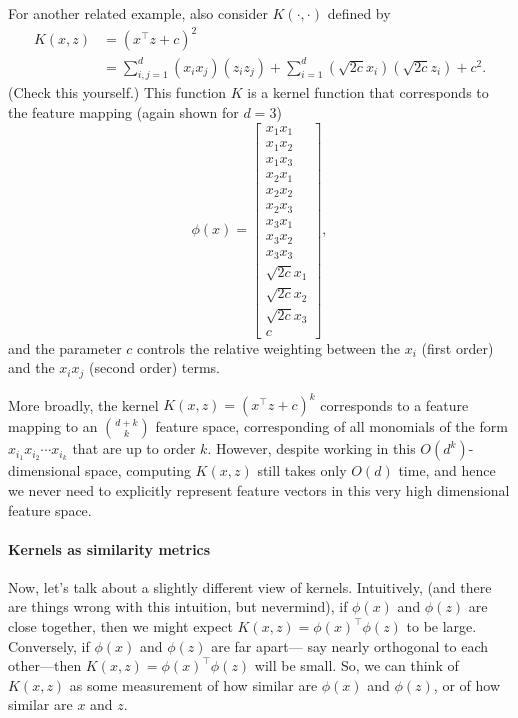 For another related example, also consider $K(\cdot,\cdot)$ defined by
\begin{align*}
    K(x,z) &= (x^\top z + c)^2\\
    &= \sum_{i,j=1}^d (x_i x_j)(z_i z_j) + \sum_{i=1}^d \left(\sqrt{2c}x_i\right) \left(\sqrt{2c}z_i\right) + c^2.
\end{align*}
(Check this yourself.) This function $K$ is a kernel function that corresponds
to the feature mapping (again shown for $d = 3$)
\begin{equation*}
    \phi(x) = \begin{bmatrix}
        x_1 x_1\\
        x_1 x_2\\
        x_1 x_3\\
        x_2 x_1\\
        x_2 x_2\\
        x_2 x_3\\
        x_3 x_1\\
        x_3 x_2\\
        x_3 x_3\\
        \sqrt{2c}x_1\\
        \sqrt{2c}x_2\\
        \sqrt{2c}x_3\\
        c
    \end{bmatrix},    
\end{equation*}
and the parameter $c$ controls the relative weighting between the $x_i$ (first
order) and the $x_i x_j$ (second order) terms.

More broadly, the kernel $K(x,z) = (x^\top z + c)^k$ corresponds to a feature
mapping to an $\binom{d+k}{k}$ feature space, corresponding of all monomials of the
form $x_{i_1} x_{i_2} \cdots x_{i_k}$ that are up to order $k$. However, despite working in this %
$O(d^k)$-dimensional space, computing $K(x,z)$ still takes only $O(d)$ time, and
hence we never need to explicitly represent feature vectors in this very high
dimensional feature space.

\paragraph{Kernels as similarity metrics} Now, let's talk about a slightly different
view of kernels. Intuitively, (and there are things wrong with this intuition,
but nevermind), if $\phi(x)$ and $\phi(z)$ are close together, then we might expect
$K(x,z) = \phi(x)^\top \phi(z)$ to be large. Conversely, if $\phi(x)$ and $\phi(z)$ are far apart---
say nearly orthogonal to each other---then $K(x,z) = \phi(x)^\top \phi(z)$ will be small.
So, we can think of $K(x,z)$ as some measurement of how similar are $\phi(x)$
and $\phi(z)$, or of how similar are $x$ and $z$.

